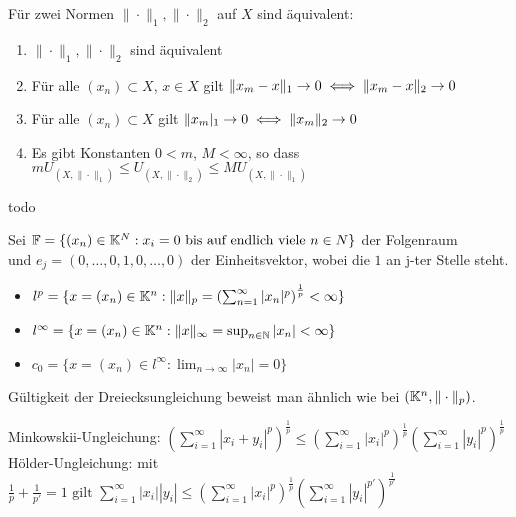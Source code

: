 \begin{prop}
Für zwei Normen $\| \cdot \|_{1}, \| \cdot \|_{2}$ auf $X$ sind äquivalent:
\begin{enumerate}
	\item $\| \cdot \|_{1}, \| \cdot \|_{2}$ sind äquivalent
	\item Für alle $(x_{n}) \subset X$, $x \in X$ gilt $\| x_{m} - x \|_{1} \rightarrow 0 \iff \| x_{m} - x \|_{2} \rightarrow 0 $
	\item Für alle $(x_{n}) \subset X$ gilt $\| x_{m} |_{1} \rightarrow 0 \iff \| x_{m} \|_{2} \rightarrow 0 $
	\item Es gibt Konstanten $0 < m$, $M < \infty$, so dass $m U_{(X, \| \cdot \|_{1})} \leq U_{(X, \| \cdot \|_{2})} \leq M U_{(X, \| \cdot \|_{1})}$
\end{enumerate}
\end{prop}
\begin{beweis}
	todo	
\end{beweis}

\begin{vereinbarung}
Sei $\mathbb{F} = \{ (x_{n}) \in \mathbb{K}^{N}: x_{i} = 0 \text{ bis auf endlich viele } n \in N  \} $ der Folgenraum \\
und $e_{j} = (0, \dotsc, 0, 1, 0, \dotsc, 0) $ der Einheitsvektor, wobei die $1$ an j-ter Stelle steht.
\end{vereinbarung}

\begin{beispiel}
	\begin{itemize}
		\item $l^{p} = \{ x = (x_{n}) \in \mathbb{K}^n: \|x\|_{p} = \left( \sum_{n = 1}^{\infty} | x_{n} |^{p}\right)^{\frac{1}{p}} < \infty \}$
		\item $l^{\infty} = \{ x = (x_{n}) \in \mathbb{K}^n: \|x\|_{\infty} = \sup_{n \in \mathbb{N}} |x_{n}| < \infty \}$
		\item $c_{0} = \{ x = (x_{n}) \in l^{\infty}: \lim_{n \rightarrow \infty} |x_{n}| = 0 \}$
	\end{itemize}
Gültigkeit der Dreiecksungleichung beweist man ähnlich wie bei $(\mathbb{K}^{n}, \| \cdot \|_{p})$.
\end{beispiel}

\begin{lemma}
Minkowskii-Ungleichung: $\left( \sum_{i=1}^{\infty} |x_{i} + y_{i}|^p\right)^{\frac{1}{p}} \leq\left( \sum_{i=1}^{\infty} |x_{i}|^p\right)^{\frac{1}{p}} \left( \sum_{i=1}^{\infty} |y_{i}|^p\right)^{\frac{1}{p}} $	\\
Hölder-Ungleichung: mit $\frac{1}{p} + \frac{1}{p'} = 1 \text{ gilt } \sum_{i=1}^{\infty} |x_{i}| |y_{i}| \leq \left( \sum_{i=1}^{\infty} |x_{i}|^{p} \right)^{\frac{1}{p}} \left( \sum_{i=1}^{\infty} |y_{i}|^{p'} \right)^{\frac{1}{p'}} $	\\	
\end{lemma}

